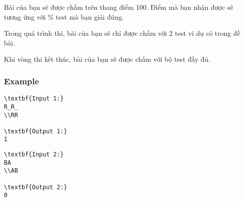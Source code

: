    Bài của bạn sẽ được chấm trên thang điểm 100. Điểm mà bạn nhận được sẽ tương ứng với \% test mà bạn giải đúng.  

   Trong quá trình thi, bài của bạn sẽ chỉ được chấm với 2 test ví dụ có trong đề bài.  

   Khi vòng thi kết thúc, bài của bạn sẽ được chấm với bộ test đầy đủ.  

\subsubsection{   Example  }
\begin{verbatim}
\textbf{Input 1:}
R_R_
\\RR

\textbf{Output 1:}
1
\end{verbatim}
\begin{verbatim}
\textbf{Input 2:}
BA
\\AB

\textbf{Output 2:}
0\end{verbatim}
